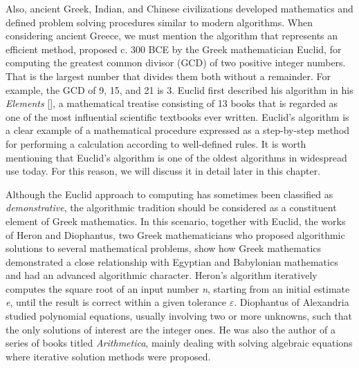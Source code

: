 {Also, ancient Greek, Indian, and Chinese civilizations developed mathematics and defined problem solving procedures similar to modern algorithms. When considering ancient Greece, we must mention the algorithm that represents an efficient method, proposed c. 300 BCE by the Greek mathematician Euclid, for computing the greatest common divisor (GCD) of two positive integer numbers. That is the largest number that divides them both without a remainder. For example, the GCD of 9, 15, and 21 is 3. Euclid first described his algorithm in his \textit{Elements} [\citealt{chap:01:Fitzpatrick:2008}], a mathematical treatise consisting of 13 books that is regarded as one of the most influential scientific textbooks ever written. Euclid's algorithm is a clear example of a mathematical procedure expressed as a step-by-step method for performing a calculation according to well-defined rules. It is worth mentioning that Euclid's algorithm is one of the oldest algorithms in widespread use today. For this reason, we will discuss it in detail later in this chapter.

Although the Euclid approach to computing has sometimes been classified as \textit{demonstrative},  the algorithmic tradition should be considered as a constituent element of Greek mathematics. In this scenario, together with Euclid, the works of Heron and Diophantus, two Greek mathematicians who proposed algorithmic solutions to several mathematical problems, show how Greek mathematics demonstrated a close relationship with Egyptian and Babylonian mathematics and had an advanced algorithmic character. Heron's algorithm iteratively computes the square root of an input number \textit{n}, starting from an initial estimate \textit{e}, until the result is correct within a given tolerance $\varepsilon$. Diophantus of Alexandria studied polynomial equations, usually involving two or more unknowns, such that the only solutions of interest are the integer ones. He was also the author of a series of books titled \textit{Arithmetica}, mainly dealing with solving algebraic equations where iterative solution methods were proposed.

}
